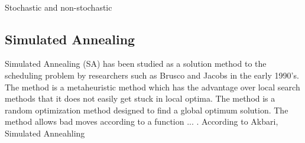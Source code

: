 %
%
%
%
%
%
%
%
%
%

\ %


Stochastic and non-stochastic

\subsection{Simulated Annealing}

Simulated Annealing (SA) has been studied as a solution method to the scheduling problem by researchers such as Brusco and Jacobs in the early 1990's. The method is a metaheuristic method which has the advantage over local search methods that it does not easily get stuck in local optima. The method is a random optimization method designed to find a global optimum solution. The method allows bad moves according to a function ... . 
According to Akbari, Simulated Anneahling 

